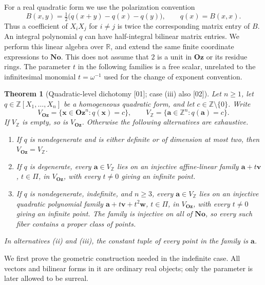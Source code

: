 \documentclass[11pt,oneside]{article}
\numberwithin{equation}{section}
\newtheorem{theorem}{Theorem}[section]
\theoremstyle{definition}
\theoremstyle{remark}
\newcommand{\No}{\mathbf{No}}
\newcommand{\Oz}{\mathbf{Oz}}
\newcommand{\Z}{\mathbb Z}
\newcommand{\R}{\mathbb R}
\newcommand{\src}[1]{\textup{\textsf{\small[#1]}}}
\begin{document}
For a real quadratic form we use the polarization convention
\[
 B(x,y)=\tfrac12\bigl(q(x+y)-q(x)-q(y)\bigr),\qquad q(x)=B(x,x).
\]
Thus a coefficient of $X_iX_j$ for $i\ne j$ is twice the corresponding
matrix entry of $B$. An integral polynomial $q$ can have half-integral
bilinear matrix entries. We perform this linear algebra over $\R$, and
extend the same finite coordinate expressions to $\No$. This does not assume
that $2$ is a unit in $\Oz$ or its residue rings. The parameter $t$ in the
following families is a free scalar, unrelated to the infinitesimal monomial
$t=\omega^{-1}$ used for the change of exponent convention.

\begin{theorem}[Quadratic-level dichotomy \src{01}; case (iii) also \src{02}]\label{odg:thm:quadclassification}
Let $n\geq1$, let $q\in\Z[X_1,\ldots,X_n]$ be a homogeneous quadratic
form, and let $c\in\Z\setminus\{0\}$. Write
\[
 V_{\Oz}=\{\mathbf x\in\Oz^n:q(\mathbf x)=c\},\qquad
 V_\Z=\{\mathbf a\in\Z^n:q(\mathbf a)=c\}.
\]
If $V_\Z$ is empty, so is $V_{\Oz}$. Otherwise the following alternatives
are exhaustive.
\begin{enumerate}[label=\textup{(\roman*)},leftmargin=*]
\item If $q$ is nondegenerate and is either definite or of dimension at
most two, then $V_{\Oz}=V_\Z$.
\item If $q$ is degenerate, every $\mathbf a\in V_\Z$ lies on an
injective affine-linear family $\mathbf a+t\mathbf v$, $t\in\Pi$,
in $V_{\Oz}$, with every $t\ne0$ giving an infinite point.
\item If $q$ is nondegenerate, indefinite, and $n\geq3$, every
$\mathbf a\in V_\Z$ lies on an injective quadratic polynomial family
$\mathbf a+t\mathbf v+t^2\mathbf w$, $t\in\Pi$, in $V_{\Oz}$, with every
$t\ne0$ giving an infinite point. The family is injective on all of $\No$,
so every such fiber contains a proper class of points.
\end{enumerate}
In alternatives \textup{(ii)} and \textup{(iii)}, the constant tuple of
every point in the family is $\mathbf a$.
\end{theorem}

We first prove the geometric construction needed in the indefinite case.
All vectors and bilinear forms in it are ordinary real objects; only the
parameter is later allowed to be surreal.
\end{document}
